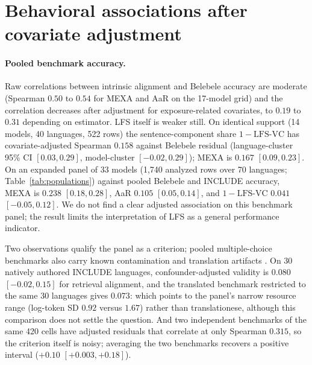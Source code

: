 \documentclass{article} %
\begin{document}
\section{Behavioral associations after covariate adjustment}
\label{sec:validity}

\paragraph{Pooled benchmark accuracy.} Raw correlations between intrinsic alignment and Belebele accuracy are moderate (Spearman $0.50$ to $0.54$ for MEXA and AaR on the 17-model grid) and the correlation decreases after adjustment for exposure-related covariates, to $0.19$ to $0.31$ depending on estimator. LFS itself is weaker still. On identical support (14 models, 40 languages, 522 rows) the sentence-component share $1 - \mathrm{LFS\text{-}VC}$ has covariate-adjusted Spearman $0.158$ against Belebele residual (language-cluster 95\% CI $[0.03, 0.29]$, model-cluster $[-0.02, 0.29]$); MEXA is $0.167$ $[0.09, 0.23]$. On an expanded panel of 33 models (1,740 analyzed rows over 70 languages; Table~\ref{tab:populations}) against pooled Belebele and INCLUDE accuracy, MEXA is $0.238$ $[0.18, 0.28]$, AaR $0.105$ $[0.05, 0.14]$, and $1-\mathrm{LFS\text{-}VC}$ $0.041$ $[-0.05, 0.12]$.
We do not find a clear adjusted association on this benchmark panel; the
result limits the interpretation of LFS as a general performance indicator.

Two observations qualify the panel as a criterion; pooled multiple-choice benchmarks also carry known contamination and translation artifacts \citep{deng2024contamination,gema2025mmlu}. On 30 natively authored INCLUDE languages, confounder-adjusted validity is $0.080$ $[-0.02, 0.15]$ for retrieval alignment, and the translated benchmark restricted to the same 30 languages gives $0.073$: which points to the panel's narrow resource range (log-token SD $0.92$ versus $1.67$) rather than translationese, although this comparison does not settle the question. And two independent benchmarks of the same 420 cells have adjusted residuals that correlate at only Spearman $0.315$, so the criterion itself is noisy; averaging the two benchmarks recovers a positive interval ($+0.10$ $[+0.003, +0.18]$).
\end{document}
